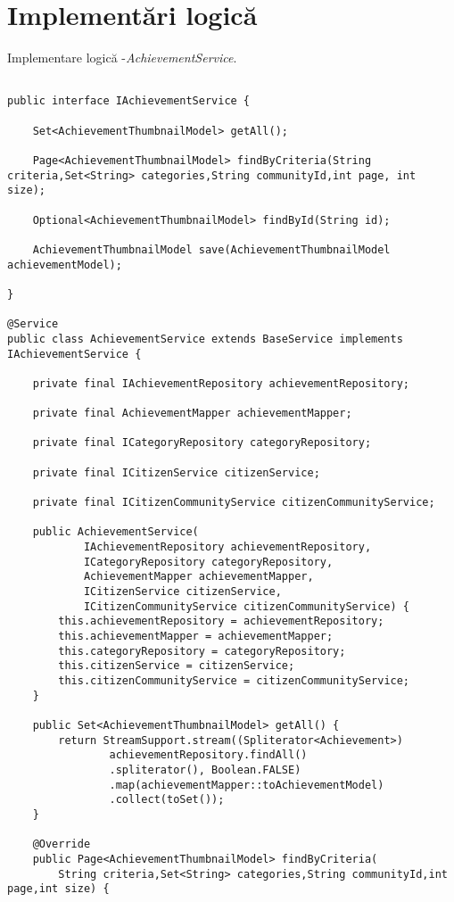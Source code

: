 \section{Implementări logică}
Implementare logică -\textit{AchievementService}.
\begin {lstlisting}

public interface IAchievementService {

    Set<AchievementThumbnailModel> getAll();
    
	Page<AchievementThumbnailModel> findByCriteria(String criteria,Set<String> categories,String communityId,int page, int size); 
	
	Optional<AchievementThumbnailModel> findById(String id);

	AchievementThumbnailModel save(AchievementThumbnailModel achievementModel);
	
}

@Service
public class AchievementService extends BaseService implements IAchievementService {

    private final IAchievementRepository achievementRepository;
    
    private final AchievementMapper achievementMapper;
    
    private final ICategoryRepository categoryRepository;
    
    private final ICitizenService citizenService;
    
    private final ICitizenCommunityService citizenCommunityService;

    public AchievementService(
    		IAchievementRepository achievementRepository,
    		ICategoryRepository categoryRepository,
    		AchievementMapper achievementMapper,
    		ICitizenService citizenService,
    		ICitizenCommunityService citizenCommunityService) {
        this.achievementRepository = achievementRepository;
        this.achievementMapper = achievementMapper;
        this.categoryRepository = categoryRepository;
        this.citizenService = citizenService;
        this.citizenCommunityService = citizenCommunityService;
    }

    public Set<AchievementThumbnailModel> getAll() {
        return StreamSupport.stream((Spliterator<Achievement>)
                achievementRepository.findAll()
                .spliterator(), Boolean.FALSE)
                .map(achievementMapper::toAchievementModel)
                .collect(toSet());
    }

	@Override
	public Page<AchievementThumbnailModel> findByCriteria(
        String criteria,Set<String> categories,String communityId,int page,int size) {
		

\end{lstlisting}
